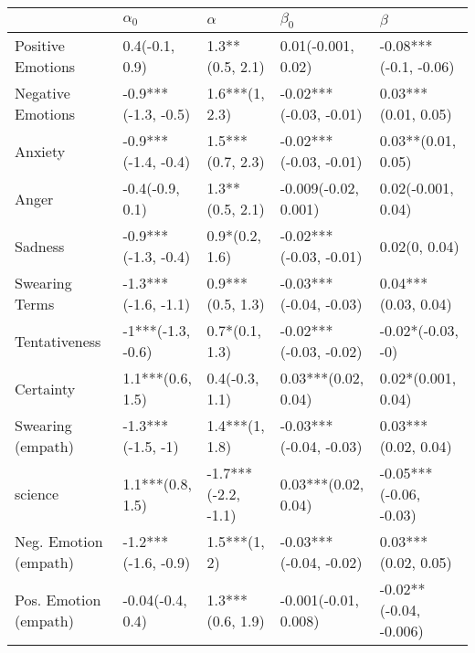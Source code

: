 \begin{tabular}{lllll}
\toprule
{} &           $\alpha_0$ &             $\alpha$ &               $\beta_0$ &                 $\beta$ \\
\midrule
Positive Emotions     &       0.4(-0.1, 0.9) &      1.3**(0.5, 2.1) &      0.01(-0.001, 0.02) &   -0.08***(-0.1, -0.06) \\
Negative Emotions     &  -0.9***(-1.3, -0.5) &       1.6***(1, 2.3) &  -0.02***(-0.03, -0.01) &     0.03***(0.01, 0.05) \\
Anxiety               &  -0.9***(-1.4, -0.4) &     1.5***(0.7, 2.3) &  -0.02***(-0.03, -0.01) &      0.03**(0.01, 0.05) \\
Anger                 &      -0.4(-0.9, 0.1) &      1.3**(0.5, 2.1) &    -0.009(-0.02, 0.001) &      0.02(-0.001, 0.04) \\
Sadness               &  -0.9***(-1.3, -0.4) &       0.9*(0.2, 1.6) &  -0.02***(-0.03, -0.01) &           0.02(0, 0.04) \\
Swearing Terms        &  -1.3***(-1.6, -1.1) &     0.9***(0.5, 1.3) &  -0.03***(-0.04, -0.03) &     0.04***(0.03, 0.04) \\
Tentativeness         &    -1***(-1.3, -0.6) &       0.7*(0.1, 1.3) &  -0.02***(-0.03, -0.02) &       -0.02*(-0.03, -0) \\
Certainty             &     1.1***(0.6, 1.5) &       0.4(-0.3, 1.1) &     0.03***(0.02, 0.04) &      0.02*(0.001, 0.04) \\
Swearing (empath)     &    -1.3***(-1.5, -1) &       1.4***(1, 1.8) &  -0.03***(-0.04, -0.03) &     0.03***(0.02, 0.04) \\
science               &     1.1***(0.8, 1.5) &  -1.7***(-2.2, -1.1) &     0.03***(0.02, 0.04) &  -0.05***(-0.06, -0.03) \\
Neg. Emotion (empath) &  -1.2***(-1.6, -0.9) &         1.5***(1, 2) &  -0.03***(-0.04, -0.02) &     0.03***(0.02, 0.05) \\
Pos. Emotion (empath) &     -0.04(-0.4, 0.4) &     1.3***(0.6, 1.9) &    -0.001(-0.01, 0.008) &  -0.02**(-0.04, -0.006) \\
\bottomrule
\end{tabular}

